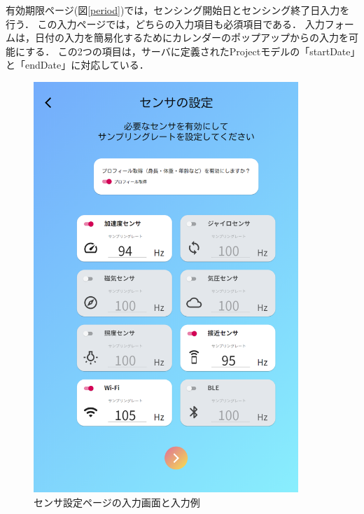 有効期限ページ(図\ref{period})では，センシング開始日とセンシング終了日入力を行う．
この入力ページでは，どちらの入力項目も必須項目である．
入力フォームは，日付の入力を簡易化するためにカレンダーのポップアップからの入力を可能にする．
この2つの項目は，サーバに定義されたProjectモデルの「startDate」と「endDate」に対応している．
\begin{figure}[H]
  \centering
  \includegraphics[width=100mm]{sensors.png}
  \caption{センサ設定ページの入力画面と入力例}
  \label{sensors}
\end{figure}

